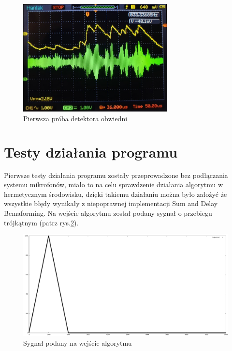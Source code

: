\documentclass[eng,printmode]{mgr}
\begin{document}
\begin{figure}[ht]

    \centering

  \includegraphics[width=0.7\textwidth, angle=0]{obwiednia_syg1.png}

    \caption{Pierwsza próba detektora obwiedni}
 \label{fig-przebieg1}
    

\end{figure}





\section{Testy działania programu}
Pierwsze testy działania programu zostały przeprowadzone bez podłączania systemu mikrofonów, miało to na celu sprawdzenie działania algorytmu w hermetycznym środowisku, dzięki takiemu działaniu można było założyć że wszystkie błędy wynikały z niepoprawnej implementacji Sum and Delay Bemaforming.
Na wejście algorytmu został podany sygnał o przebiegu trójkątnym (patrz rys.\ref{fig-sygnal}).
\begin{figure}[ht]

    \centering

  \includegraphics[width=1.1\textwidth, angle=0]{sygnal.png}

    \caption{Sygnał podany na wejście algorytmu}
 \label{fig-sygnal}
    

\end{figure}
\end{document}

